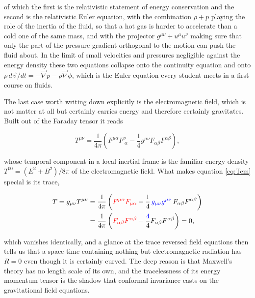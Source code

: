         of which the first is the relativistic statement of energy conservation and the second is the relativistic Euler equation, with the combination $\rho + p$ playing the role of the inertia of the fluid, so that a hot gas is harder to accelerate than a cold one of the same mass, and with the projector $g^{\mu\nu}+u^{\mu}u^{\nu}$ making sure that only the part of the pressure gradient orthogonal to the motion can push the fluid about. In the limit of small velocities and pressures negligible against the energy density these two equations collapse onto the continuity equation and onto $\rho\,d\Vec{v}/dt = -\Vec{\nabla}p - \rho\Vec{\nabla}\phi$, which is the Euler equation every student meets in a first course on fluids.

        The last case worth writing down explicitly is the electromagnetic field, which is not matter at all but certainly carries energy and therefore certainly gravitates. Built out of the Faraday tensor it reads

        \begin{equation}\label{eq:Tem}
            T^{\mu\nu} = \frac{1}{4\pi}\left(F^{\mu\alpha}F^{\nu}_{\;\alpha} - \frac{1}{4}g^{\mu\nu}F_{\alpha\beta}F^{\alpha\beta}\right),
        \end{equation}

        whose temporal component in a local inertial frame is the familiar energy density $T^{00}=\left(E^2+B^2\right)/8\pi$ of the electromagnetic field. What makes equation \ref{eq:Tem} special is its trace,

        \begin{align*}
            T = g_{\mu\nu}T^{\mu\nu} &= \frac{1}{4\pi}\left({\color{red}F^{\mu\alpha}F_{\mu\alpha}} - \frac{1}{4}\,{\color{blue}g_{\mu\nu}g^{\mu\nu}}\,F_{\alpha\beta}F^{\alpha\beta}\right)\\
            &= \frac{1}{4\pi}\left({\color{red}F_{\alpha\beta}F^{\alpha\beta}} - \frac{{\color{blue}4}}{4}F_{\alpha\beta}F^{\alpha\beta}\right) = 0,
        \end{align*}

        which vanishes identically, and a glance at the trace reversed field equations then tells us that a space-time containing nothing but electromagnetic radiation has $R=0$ even though it is certainly curved. The deep reason is that Maxwell's theory has no length scale of its own, and the tracelessness of its energy momentum tensor is the shadow that conformal invariance casts on the gravitational field equations.

